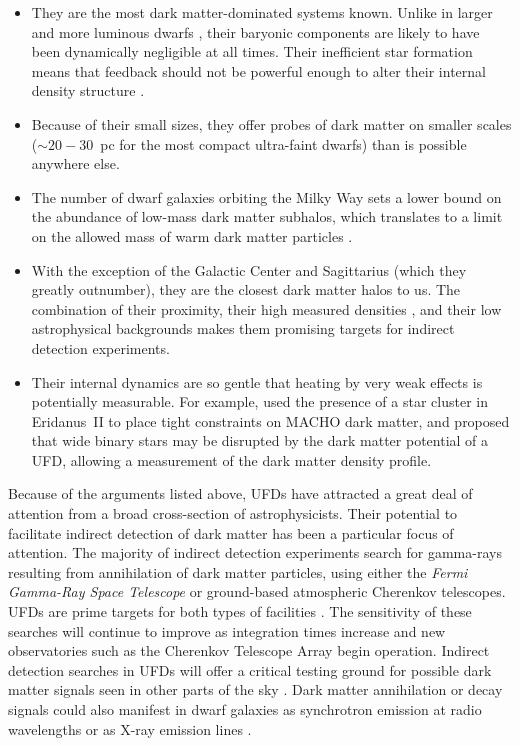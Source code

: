 \documentclass[a4paper]{ar-1col}
\begin{document}
\begin{itemize}
\item They are the most dark matter-dominated systems known.  Unlike
  in larger and more luminous dwarfs \citep[e.g.,][]{bz14,dicintio14},
  their baryonic components are likely to have been dynamically
  negligible at all times.  Their inefficient star formation means
  that feedback should not be powerful enough to alter their internal
  density structure \citep[e.g.,][]{onorbe15}.

\item Because of their small sizes, they offer probes of dark matter
  on smaller scales ($\sim20-30$~pc for the most compact ultra-faint
  dwarfs) than is possible anywhere else.

\item The number of dwarf galaxies orbiting the Milky Way sets a
  lower bound on the abundance of low-mass dark matter subhalos, which
  translates to a limit on the allowed mass of warm dark matter
  particles \citep[e.g.,][]{kennedy14}.

\item With the exception of the Galactic Center and Sagittarius (which
  they greatly outnumber), they are the closest dark matter halos to
  us.  The combination of their proximity, their high measured
  densities \citep[e.g.,][]{sg07}, and their low astrophysical
  backgrounds makes them promising targets for indirect detection
  experiments.

\item Their internal dynamics are so gentle that heating by very weak
  effects is potentially measurable.  For example, \citet{brandt16}
  used the presence of a star cluster in Eridanus~II to place tight
  constraints on MACHO dark matter, and \citet{penarrubia16} proposed
  that wide binary stars may be disrupted by the dark matter potential
  of a UFD, allowing a measurement of the dark matter density profile.

\end{itemize}

Because of the arguments listed above, UFDs have attracted a great
deal of attention from a broad cross-section of astrophysicists.
Their potential to facilitate indirect detection of dark matter has
been a particular focus of attention.  The majority of indirect
detection experiments search for gamma-rays resulting from
annihilation of dark matter particles, using either the \emph{Fermi
  Gamma-Ray Space Telescope} or ground-based atmospheric Cherenkov
telescopes.  UFDs are prime targets for both types of facilities
\citep[e.g.,][]{magic16,albert17,archambault17}.  The sensitivity of
these searches will continue to improve as integration times increase
and new observatories such as the Cherenkov Telescope Array begin
operation.  Indirect detection searches in UFDs will offer a critical
testing ground for possible dark matter signals seen in other parts of
the sky \citep[e.g.,][]{ak16}.  Dark matter annihilation or decay
signals could also manifest in dwarf galaxies as synchrotron emission
at radio wavelengths \citep{spekkens13,regis17} or as X-ray emission
lines \citep[e.g.,][]{jp16}.
\end{document}
